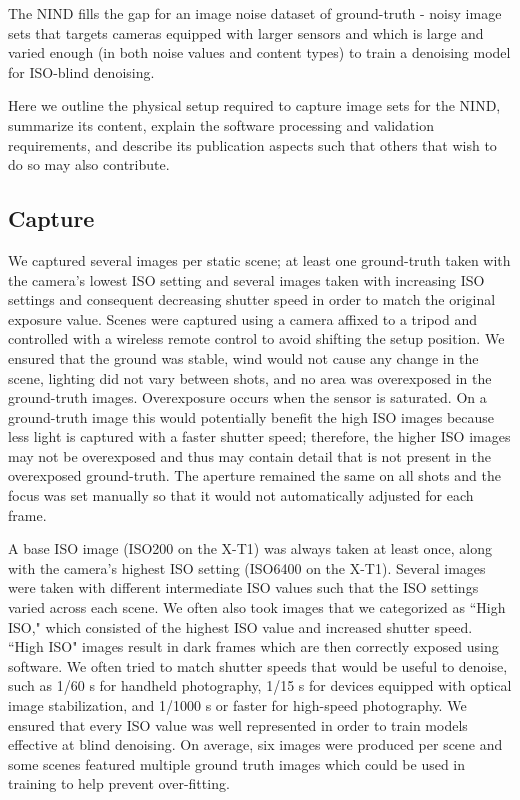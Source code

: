 The \acf{NIND} fills the gap for an image noise dataset of ground-truth - noisy image sets that targets cameras equipped with larger sensors and which is large and varied enough (in both noise values and content types) to train a denoising model for ISO-blind denoising.%

Here we outline the physical setup required to capture image sets for the \ac{NIND}, summarize its content, explain the software processing and validation requirements, and describe its publication aspects such that others that wish to do so may also contribute.
\subsection{Capture}
We captured several images per static scene; at least one ground-truth taken with the camera's lowest ISO setting and several images taken with increasing ISO settings and consequent decreasing shutter speed in order to match the original exposure value. Scenes were captured using a camera affixed to a tripod and controlled with a wireless remote control to avoid shifting the setup position. We ensured that the ground was stable, wind would not cause any change in the scene, lighting did not vary between shots, and no area was overexposed in the ground-truth images. Overexposure occurs when the sensor is saturated. On a ground-truth image this would potentially benefit the high ISO images because less light is captured with a faster shutter speed; therefore, the higher ISO images may not be overexposed and thus may contain detail that is not present in the overexposed ground-truth. The aperture remained the same on all shots and the focus was set manually so that it would not automatically adjusted for each frame.

A base ISO image (ISO200 on the \acl{X-T1}) was always taken at least once, along with the camera's highest ISO setting (ISO6400 on the \acs{X-T1}). Several images were taken with different intermediate ISO values such that the ISO settings varied across each scene. We often also took images that we categorized as ``High ISO," which consisted of the highest ISO value and increased shutter speed. ``High ISO" images result in dark frames which are then correctly exposed using software. We often tried to match shutter speeds that would be useful to denoise, such as 1/60 s for handheld photography, 1/15 s for devices equipped with optical image stabilization, and 1/1000 s or faster for high-speed photography. We ensured that every ISO value was well represented in order to train models effective at blind denoising. On average, six images were produced per scene and some scenes featured multiple ground truth images which could be used in training to help prevent over-fitting.
